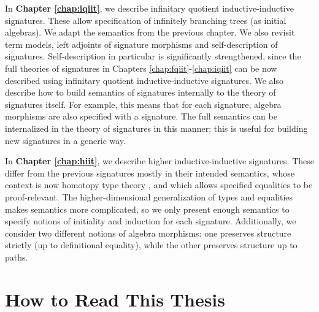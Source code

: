 \documentclass[12pt,a4paper,twoside,openany]{book}
\theoremstyle{remark}
\theoremstyle{definition}
\theoremstyle{theorem}
\begin{document}
In \textbf{Chapter \ref{chap:iqiit}}, we describe infinitary quotient
inductive-inductive signatures. These allow specification of infinitely
branching trees (as initial algebras). We adapt the semantics from the previous
chapter. We also revisit term models, left adjoints of signature morphisms and
self-description of signatures. Self-description in particular is significantly
strengthened, since the full theories of signatures in Chapters
\ref{chap:fqiit}-\ref{chap:iqiit} can be now described using infinitary quotient
inductive-inductive signatures. We also describe how to build semantics of
signatures internally to the theory of signatures itself. For example, this
means that for each signature, algebra morphisms are also specified with a
signature. The full semantics can be internalized in the theory of signatures
in this manner; this is useful for building new signatures in a generic way.

In \textbf{Chapter \ref{chap:hiit}}, we describe higher inductive-inductive
signatures. These differ from the previous signatures mostly in their intended
semantics, whose context is now homotopy type theory \cite{hottbook}, and which
allows specified equalities to be proof-relevant. The higher-dimensional
generalization of types and equalities makes semantics more complicated, so we
only present enough semantics to specify notions of initiality and induction for
each signature. Additionally, we consider two different notions of algebra
morphisms: one preserves structure strictly (up to definitional equality), while
the other preserves structure up to paths.

\section{How to Read This Thesis}
\end{document}
